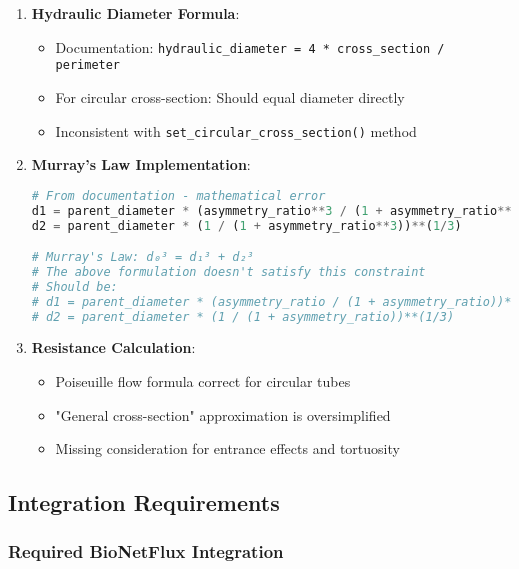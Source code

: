 \begin{enumerate}
    \item \textbf{Hydraulic Diameter Formula}:
    \begin{itemize}
        \item Documentation: \texttt{hydraulic\_diameter = 4 * cross\_section / perimeter}
        \item For circular cross-section: Should equal diameter directly
        \item Inconsistent with \texttt{set\_circular\_cross\_section()} method
    \end{itemize}
    
    \item \textbf{Murray's Law Implementation}:
    \begin{lstlisting}[language=Python, caption=Mathematical Error in Murray's Law]
# From documentation - mathematical error
d1 = parent_diameter * (asymmetry_ratio**3 / (1 + asymmetry_ratio**3))**(1/3)
d2 = parent_diameter * (1 / (1 + asymmetry_ratio**3))**(1/3)

# Murray's Law: d₀³ = d₁³ + d₂³
# The above formulation doesn't satisfy this constraint
# Should be:
# d1 = parent_diameter * (asymmetry_ratio / (1 + asymmetry_ratio))**(1/3) 
# d2 = parent_diameter * (1 / (1 + asymmetry_ratio))**(1/3)
    \end{lstlisting}
    
    \item \textbf{Resistance Calculation}:
    \begin{itemize}
        \item Poiseuille flow formula correct for circular tubes
        \item "General cross-section" approximation is oversimplified
        \item Missing consideration for entrance effects and tortuosity
    \end{itemize}
\end{enumerate}

\subsection{Integration Requirements}

\subsubsection{Required BioNetFlux Integration}

